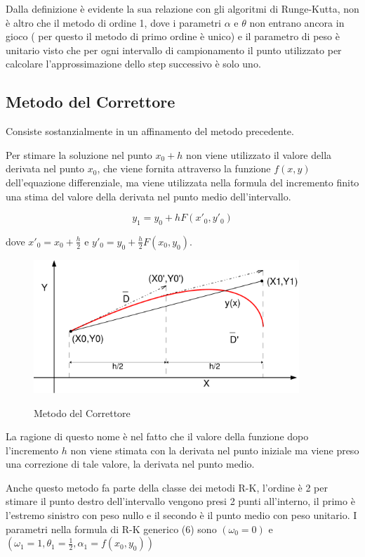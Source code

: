 \documentclass[11pt]{article}
\begin{document}
Dalla definizione è evidente la sua relazione con gli algoritmi di Runge-Kutta, non è altro che il metodo di ordine 1, dove i parametri $\alpha$ e $\theta$ non entrano ancora in gioco ( per questo il metodo di primo ordine è unico) e il parametro di peso è unitario visto che per ogni intervallo di campionamento il punto utilizzato per calcolare l'approssimazione dello step successivo è solo uno.

\subsection{Metodo del Correttore}
Consiste sostanzialmente in un affinamento del metodo precedente.

Per stimare la soluzione nel punto $x_{0}+h$ non viene utilizzato il valore della derivata nel punto $x_{0}$, che viene fornita attraverso la funzione $f(x,y)$ dell'equazione differenziale,  ma viene utilizzata nella formula del incremento finito una stima del valore della derivata nel punto medio dell'intervallo.

	\begin{equation}
	y_{1}=y_{0} + h F(x'_{0},y'_{0})
	\end{equation}

dove  $x'_{0}=x_{0} + \frac{h}{2}$ e $y'_{0} = y_{0} + \frac{h}{2}F(x_{0},y_{0})$.

\begin{figure}[!h]
\caption{Metodo del Correttore}
\includegraphics[width=10cm,keepaspectratio]{picture/correttore}
\centering
\label{fig:correttore}
\end{figure}

La ragione di questo nome è nel fatto che il valore della funzione dopo l'incremento $h$ non viene stimata con la derivata nel punto iniziale ma viene preso una correzione di tale valore, la derivata nel punto medio.

Anche questo metodo fa parte della classe dei metodi R-K, l'ordine è 2 per stimare il punto destro dell'intervallo vengono presi 2 punti all'interno, il primo è l'estremo sinistro con peso nullo e il secondo è il punto medio con peso unitario.
I parametri nella formula di R-K generico (6) sono $ (\omega_{0}=0)$ e $(\omega_{1}=1 , \theta_{1}=\frac{1}{2}, \alpha_{1}=f(x_{0},y_{0}))$
\end{document}
